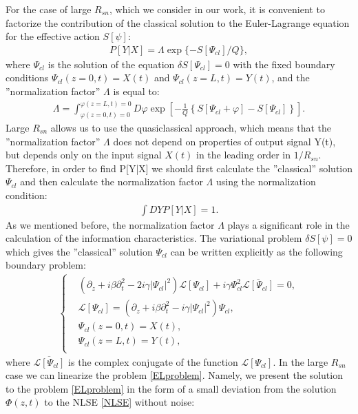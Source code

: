 \documentclass{article}
\begin{document}
For the case of large $R_{sn}$, which we consider in our work, it is convenient to factorize the contribution of the classical solution to the Euler-Lagrange equation for the effective action $S[\psi]$:
\begin{eqnarray}\label{P[Y|X]quas}
    P[Y|X] = \Lambda\exp\{-S[\Psi_{cl}]/Q\},
\end{eqnarray}
where $\Psi_{cl}$ is the solution of the equation $\delta S[\Psi_{cl}] = 0$ with the fixed boundary conditions $\Psi_{cl}(z=0,t) = X(t)$ and $\Psi_{cl}(z=L,t) = Y(t)$, and the ''normalization factor'' $\Lambda$ is equal to:
\begin{eqnarray}\label{Lambdaexplicit}
    \Lambda = \int_{\varphi(z = 0, t) = 0}^{\varphi(z = L, t) = 0} D\varphi \exp\left[-\frac{1}{Q}\left\{S[\Psi_{cl} + \varphi] - S[\Psi_{cl}]\right\}\right].
\end{eqnarray}
Large $R_{sn}$ allows us to use the quasiclassical approach, which means that the ''normalization factor'' $\Lambda$ does not depend on properties of output signal Y(t), but depends only on the input signal $X(t)$ in the leading order in $1/R_{sn}$. Therefore, in order to find P[Y|X] we should first calculate the ''classical'' solution $\Psi_{cl}$ and then calculate the normalization factor $\Lambda$ using the normalization condition:
\begin{eqnarray}
    \int DY P[Y|X] = 1.
\end{eqnarray}
As we mentioned before, the normalization factor $\Lambda$ plays a significant role in the calculation of the information characteristics. 
The variational problem $\delta S[\psi] = 0$ which gives the ''classical'' solution $\Psi_{cl}$ can be written explicitly as the following boundary problem: 
\begin{eqnarray}\label{ELproblem}
    \begin{cases}
        &(\partial_{z}+i\beta\partial_{t}^{2}-2i\gamma|\Psi_{cl}|^{2})\mathcal{L}[\Psi_{cl}] + i\gamma\Psi_{cl}^{2}\overline{\mathcal{L}[\Psi_{cl}]} = 0,\\
        &\mathcal{L}[\Psi_{cl}] = (\partial_{z}+i\beta\partial_{t}^{2}-i\gamma|\Psi_{cl}|^{2})\Psi_{cl}, \\
        &\Psi_{cl}(z=0,t) = X(t), \\
        &\Psi_{cl}(z=L,t) = Y(t), \\
    \end{cases}
\end{eqnarray}
where $\overline{\mathcal{L}[\Psi_{cl}]}$ is the complex conjugate of the function $\mathcal{L}[\Psi_{cl}]$. In the large $R_{sn}$ case we can linearize the problem \eqref{ELproblem}. Namely, we present the solution to the problem \eqref{ELproblem} in the form of a small deviation from the solution $\Phi(z,t)$ to the NLSE \eqref{NLSE} without noise: 
\end{document}
